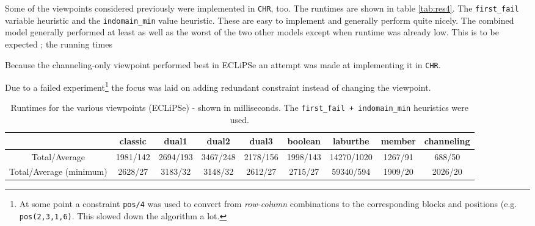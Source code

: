 Some of the viewpoints considered previously were implemented in \texttt{CHR}, too. The runtimes are shown in table \ref{tab:res4}. The \texttt{first\_fail} variable heuristic and the \texttt{indomain\_min} value heuristic. These are easy to implement and generally perform quite nicely. The combined model generally performed at least as well as the worst of the two other models except when runtime was already low. This is to be expected ; the running times\\\par 

Because the channeling-only viewpoint performed best in ECLiPSe an attempt was made at implementing it in \texttt{CHR}. \\\par 

Due to a failed experiment\footnote{At some point a constraint \texttt{pos/4} was used to convert from \textit{row-column} combinations to the corresponding blocks and positions (e.g. \texttt{pos(2,3,1,6)}. This slowed down the algorithm a lot.} the focus was laid on adding redundant constraint instead of changing the viewpoint.

\newpage
\begin{table}[h]
\footnotesize
\bgroup
\def\arraystretch{1.3}
\begin{tabular}{ccccccccc}
\multicolumn{1}{l}{} & classic & dual1 & dual2 & dual3 & boolean & laburthe & member & channeling \\ \hline
Total/Average & 1981/142 & 2694/193 & 3467/248 & 2178/156 & 1998/143 & 14270/1020 & 1267/91 & 688/50 \\
Total/Average (minimum) & 2628/27 & 3183/32 & 3148/32 & 2612/27 & 2715/27 & 59340/594 & 1909/20 & 2026/20
\end{tabular}
\egroup
\caption{Runtimes for the various viewpoints (ECLiPSe) - shown in milliseconds. The \texttt{first\_fail + indomain\_min} heuristics were used.}
\label{tab:res1}
\end{table}

